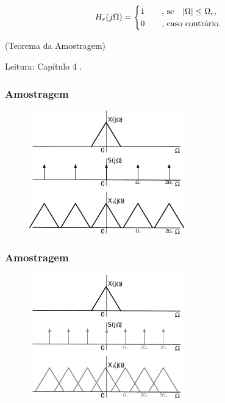 \begin{frame}[allowframebreaks]
  \begin{equation}
  H_r (j \Omega) = \begin{cases}1 \quad & \textmd{, se \ \ } \vert \Omega \vert \leq \Omega_c,\\ 0 & \mbox{, caso contrário.}\end{cases}
  \end{equation}

  \vspace{2ex}
  (Teorema da Amostragem)

  \vspace{3ex}
  Leitura: Capítulo 4 .
\end{frame}



\begin{frame}%
  \frametitle{Amostragem}

  \begin{figure}[h]
  \centering
  \includegraphics[width=0.6\textwidth]{images/sampling-freq-a.pdf}
  \label{fig-sampling-freq-a}
  \end{figure}

\end{frame}

\begin{frame}%
  \frametitle{Amostragem}

  \begin{figure}[h]
  \centering
  \includegraphics[width=0.6\textwidth]{images/sampling-freq-b.pdf}
  \label{fig-sampling-freq-a}
  \end{figure}

\end{frame}


